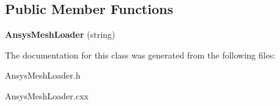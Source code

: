 \subsection*{Public Member Functions}
\begin{DoxyCompactItemize}
\item 
\hypertarget{class_ansys_mesh_loader_acaf0e42c148411b2ee0b04d979dfd20c}{
{\bfseries AnsysMeshLoader} (string)}
\label{class_ansys_mesh_loader_acaf0e42c148411b2ee0b04d979dfd20c}

\end{DoxyCompactItemize}


The documentation for this class was generated from the following files:\begin{DoxyCompactItemize}
\item 
AnsysMeshLoader.h\item 
AnsysMeshLoader.cxx\end{DoxyCompactItemize}
